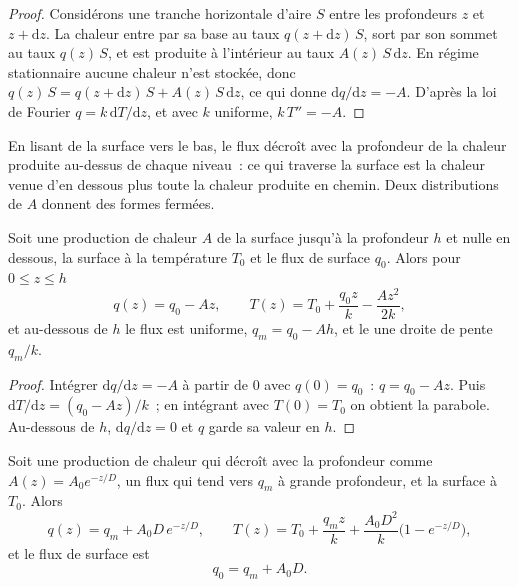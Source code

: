 \begin{proof}
Considérons une tranche horizontale d'aire $S$ entre les profondeurs $z$ et $z +
\mathrm dz$. La chaleur entre par sa base au taux $q(z + \mathrm dz)\,S$, sort
par son sommet au taux $q(z)\,S$, et est produite à l'intérieur au taux
$A(z)\,S\,\mathrm dz$. En régime stationnaire aucune chaleur n'est stockée, donc
$q(z)\,S = q(z + \mathrm dz)\,S + A(z)\,S\,\mathrm dz$, ce qui donne
$\mathrm dq/\mathrm dz = -A$. D'après la loi de Fourier $q = k\,\mathrm dT/\mathrm dz$,
et avec $k$ uniforme, $k\,T'' = -A$.
\end{proof}

En lisant de la surface vers le bas, le flux décroît avec la profondeur de la
chaleur produite au-dessus de chaque niveau~: ce qui traverse la surface est la
chaleur venue d'en dessous plus toute la chaleur produite en chemin. Deux
distributions de $A$ donnent des formes fermées.

\begin{proposition}\label{prop:b1:heat-budget:uniform}
Soit une production de chaleur $A$ de la surface jusqu'à la profondeur $h$ et
nulle en dessous, la surface à la température $T_0$ et le flux de surface $q_0$.
Alors pour $0 \le z \le h$
\[
  q(z) = q_0 - A z, \qquad T(z) = T_0 + \frac{q_0 z}{k} - \frac{A z^2}{2k},
\]
et au-dessous de $h$ le flux est uniforme, $q_m = q_0 - A h$, et le  une
droite de pente $q_m/k$.
\end{proposition}

\begin{proof}
Intégrer $\mathrm dq/\mathrm dz = -A$ à partir de $0$ avec $q(0) = q_0$~: $q = q_0 -
Az$. Puis $\mathrm dT/\mathrm dz = (q_0 - Az)/k$~; en intégrant avec $T(0) = T_0$
on obtient la parabole. Au-dessous de $h$, $\mathrm dq/\mathrm dz = 0$ et $q$
garde sa valeur en $h$.
\end{proof}

\begin{theorem}
\label{thm:b1:heat-budget:exponential}
Soit une production de chaleur qui décroît avec la profondeur comme $A(z) = A_0 e^{-z/D}$,
un flux qui tend vers $q_m$ à grande profondeur, et la surface à $T_0$. Alors
\[
  q(z) = q_m + A_0 D\,e^{-z/D}, \qquad
  T(z) = T_0 + \frac{q_m z}{k} + \frac{A_0 D^2}{k}\bigl(1 - e^{-z/D}\bigr),
\]
et le flux de surface est
\[
  q_0 = q_m + A_0 D .
\]
\end{theorem}

